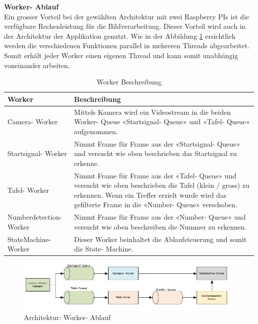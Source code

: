 \documentclass[../../main.tex]{subfiles}
\begin{document}
\newpage

\textbf{Worker- Ablauf}\\
Ein grosser Vorteil bei der gewählten Architektur mit zwei Raspberry PIs ist die verfügbare Rechenleistung für die Bildverarbeitung. Dieser Vorteil wird auch in der Architektur der Applikation genutzt. Wie in der Abbildung \ref{fig:worker-ablauf} ersichtlich werden die verschiedenen Funktionen parallel in mehreren Threads abgearbeitet. Somit erhält jeder Worker einen eigenen Thread und kann somit unabhängig voneinander arbeiten. \\

\begin{table}[H] %
  \begin{flushleft}
      \begin{tabular}{ | p{4cm} | p{10cm} |}
          \hline
          \textbf{Worker}  & \textbf{Beschreibung} \\\hline
          Camera- Worker          & Mittels Kamera wird ein Videostream in die beiden Worker- Queue «Startsignal- Queue» und «Tafel- Queue» aufgenommen. \\\hline
          Startsignal- Worker     & Nimmt Frame für Frame aus der «Startsignal- Queue» und versucht wie oben beschrieben das Startsignal zu erkenne.\\\hline
          Tafel- Worker & Nimmt Frame für Frame aus der «Tafel- Queue» und versucht wie oben beschrieben die Tafel (klein / gross) zu erkennen. Wenn ein Treffer erzielt wurde wird das gefilterte Frame in die «Number- Queue» verschoben.\\\hline
          Numberdetection- Worker & Nimmt Frame für Frame aus der «Number- Queue» und versucht wie oben beschreiben die Nummer zu erkennen. \\\hline
          StateMachine- Worker & Dieser Worker beinhaltet die Ablaufsteuerung und somit die State- Machine.\\\hline  
      \end{tabular}
  \end{flushleft}
  \caption{Worker Beschreibung}
  \label{tab:worker_beschreibung}
\end{table}


\begin{figure}[H] %
  \centering
  \includegraphics[width=1\textwidth]{worker-ablauf.png}
  \caption{Architektur: Worker- Ablauf}
  \label{fig:worker-ablauf}
\end{figure}
 
\end{document}
